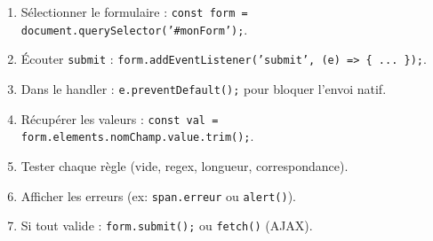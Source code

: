 \documentclass[11pt]{article}
\begin{document}
\begin{bilan}
\begin{methode}
\begin{enumerate}
    \item Sélectionner le formulaire : \texttt{const form = document.querySelector('\#monForm');}.
    \item Écouter \texttt{submit} : \texttt{form.addEventListener('submit', (e) => \{ ... \});}.
    \item Dans le handler : \texttt{e.preventDefault();} pour bloquer l'envoi natif.
    \item Récupérer les valeurs : \texttt{const val = form.elements.nomChamp.value.trim();}.
    \item Tester chaque règle (vide, regex, longueur, correspondance).
    \item Afficher les erreurs (ex: \texttt{span.erreur} ou \texttt{alert()}).
    \item Si tout valide : \texttt{form.submit();} ou \texttt{fetch()} (AJAX).
\end{enumerate}
\end{methode}
\end{bilan}
\end{document}
